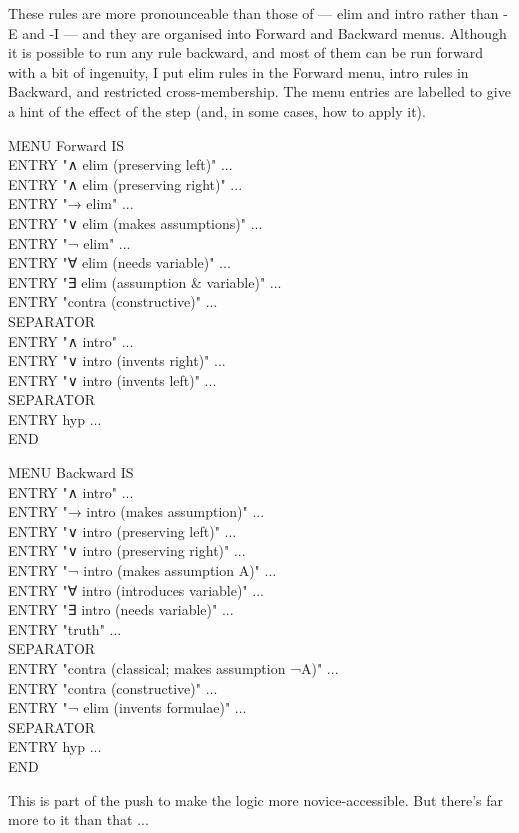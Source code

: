 These rules are more pronounceable than those of  --- elim and intro rather than -E and -I --- and they are organised into Forward and Backward menus. Although it is possible to run any rule backward, and most of them can be run forward with a bit of ingenuity, I put elim rules in the Forward menu, intro rules in Backward, and restricted cross-membership. The menu entries are labelled to give a hint of the effect of the step (and, in some cases, how to apply it).
\begin{japeish}
MENU Forward IS \\
\tab ENTRY   "∧ elim (preserving left)" ... \\
\tab ENTRY   "∧ elim (preserving right)" ... \\
\tab ENTRY   "→ elim"  ... \\
\tab ENTRY   "∨ elim (makes assumptions)" ... \\
\tab ENTRY   "¬ elim" ... \\
\tab ENTRY   "∀ elim (needs variable)" ... \\
\tab ENTRY   "∃ elim (assumption \& variable)" ... \\
\tab ENTRY   "contra (constructive)" ... \\
\tab SEPARATOR \\
\tab ENTRY   "∧ intro" ... \\
\tab ENTRY   "∨ intro (invents right)" ... \\
\tab ENTRY   "∨ intro (invents left)" ... \\
\tab SEPARATOR \\
\tab ENTRY   hyp ... \\
END

\end{japeish}
\begin{japeish}
MENU Backward IS \\
\tab ENTRY   "∧ intro" ... \\
\tab ENTRY   "→ intro (makes assumption)" ... \\
\tab ENTRY   "∨ intro (preserving left)" ... \\
\tab ENTRY   "∨ intro (preserving right)" ... \\
\tab ENTRY   "¬ intro (makes assumption A)" ... \\
\tab ENTRY   "∀ intro (introduces variable)" ... \\
\tab ENTRY   "∃ intro (needs variable)" ... \\
\tab ENTRY "truth" ... \\
\tab SEPARATOR\\
\tab ENTRY   "contra (classical; makes assumption ¬A)" ... \\
\tab ENTRY   "contra (constructive)"  ... \\
\tab ENTRY   "¬ elim (invents formulae)" ... \\
\tab SEPARATOR\\
\tab ENTRY   hyp ... \\
END
\end{japeish}
This is part of the push to make the logic more novice-accessible. But there's far more to it than that ...


